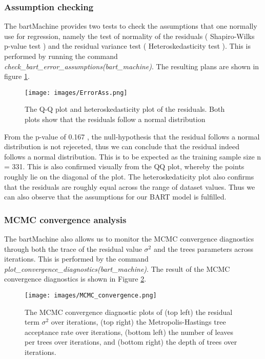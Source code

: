 \documentclass{usiinftr}
\begin{document}
\subsubsection{Assumption checking}
The bartMachine provides two tests to check the assumptions that one normally use for regression, namely the test of normality of the residuals ( Shapiro-Wilks p-value test ) and the residual variance test ( Heteroskedasticity test ). This is performed by running the command \textit{check\_bart\_error\_assumptions(bart\_machine)}. The resulting plans are shown in figure \ref{ErrorAss}.

\begin{figure}[h!] 
\centering
\texttt{[image: images/ErrorAss.png]}
\caption{The Q-Q plot and heteroskedasticity plot of the residuals. Both plots show that the residuals follow a normal distribution}
\label{ErrorAss}
\end{figure}

From the p-value of 0.167 , the null-hypothesis that the residual follows a normal distribution is not rejeceted, thus we can conclude that the residual indeed follows a normal distribution. This is to be expected as the training sample size n = 331. This is also confirmed visually from the QQ plot, whereby the points roughly lie on the diagonal of the plot. The heteroskedaticity plot also confirms that the residuals are roughly equal across the range of dataset values. Thus we can also observe that the assumptions for our BART model is fulfilled.

\subsubsection{MCMC convergence analysis}
The bartMachine also allows us to monitor the MCMC convergence diagnostics through both the trace of the residual value $\sigma^2$ and the trees parameters across iterations. This is performed by the command \textit{plot\_convergence\_diagnostics(bart\_machine)}. The result of the MCMC convergence diagnostics is shown in Figure \ref{MCMCConv}.

\begin{figure}[h!] 
\centering
\texttt{[image: images/MCMC\_convergence.png]}
\caption{The MCMC convergence diagnostic plots of (top left) the residual term $\sigma^2$ over iterations, (top right) the Metropolis-Hastings tree acceptance rate over iterations, (bottom left) the number of leaves per trees over iterations, and (bottom right) the depth of trees over iterations.}
\label{MCMCConv}
\end{figure}
\end{document}
